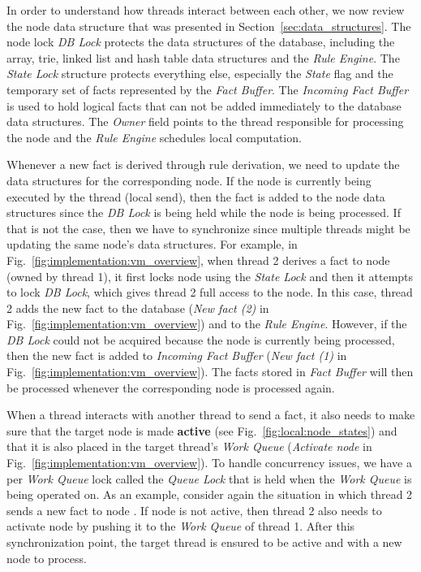 In order to understand how threads interact between each other, we now review
the node data structure that was presented in Section~\ref{sec:data_structures}.
The node lock \emph{DB Lock} protects the data structures of the database,
including the array, trie, linked list and hash table data structures and the
\emph{Rule Engine}. The \emph{State Lock} structure protects everything else,
especially the \emph{State} flag and the temporary set of facts represented by
the \emph{Fact Buffer}. The \emph{Incoming Fact Buffer} is used to hold logical facts
that can not be added immediately to the database data structures. The
\emph{Owner} field points to the thread responsible for processing the node and
the \emph{Rule Engine} schedules local computation.

Whenever a new fact is derived through rule derivation, we need to update the
data structures for the corresponding node. If the node is currently being
executed by the thread (local send), then the fact is added to the node data
structures since the \emph{DB Lock} is being held while the node is being
processed. If that is not the case, then we have to synchronize since multiple
threads might be updating the same node's data structures. For example, in
Fig.~\ref{fig:implementation:vm_overview}, when thread 2 derives a fact to node
 (owned by thread 1), it first locks node  using the
\emph{State Lock} and then it attempts to lock \emph{DB Lock}, which gives thread
2 full access to the node. In this case, thread 2 adds the new fact to the
database (\emph{New fact (2)} in Fig.~\ref{fig:implementation:vm_overview}) and
to the \emph{Rule Engine}. However, if the \emph{DB Lock} could not be acquired
because the node  is currently being processed, then the new fact is
added to \emph{Incoming Fact Buffer} (\emph{New fact (1)} in
Fig.~\ref{fig:implementation:vm_overview}). The facts stored in \emph{Fact
Buffer} will then be processed whenever the corresponding node is processed
again.

When a thread interacts with another thread to send a fact, it also needs to
make sure that the target node is made \textbf{active} (see
Fig.~\ref{fig:local:node_states}) and that it is also placed in the target
thread's \emph{Work Queue} (\emph{Activate node} in
Fig.~\ref{fig:implementation:vm_overview}). To handle concurrency issues, we
have a per \emph{Work Queue} lock called the \emph{Queue Lock} that is held when
the \emph{Work Queue} is being operated on.  As an example, consider again the
situation in which thread 2 sends a new fact to node . If node
 is not active, then thread 2 also needs to activate node  by
pushing it to the \emph{Work Queue} of thread 1.  After this synchronization
point, the target thread is ensured to be active and with a new node to process.

